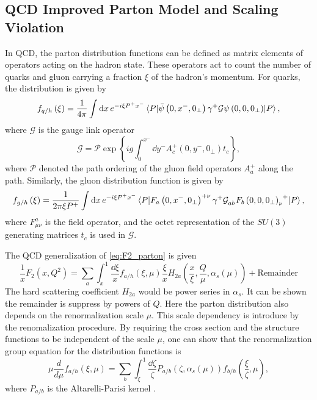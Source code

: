 \documentclass[../main.tex]{subfiles}
\begin{document}
\subsection{QCD Improved Parton Model and Scaling Violation}
\label{subsec:scaling_violation}
In QCD, the parton distribution functions can be defined as matrix elements of
operators acting on the hadron state. These operators act to count the number of
quarks and gluon carrying a fraction $\xi$ of the hadron's momentum. For quarks,
the distribution is given by \cite{collins1989}
\begin{equation}
	f_{q/h}\left(\xi\right) = \frac{1}{4\pi}\int \dd{x} e^{-i\xi P^{+} x^{-}} \mel{P}{\bar{\psi}\left(0,x^-,0_\perp\right)\gamma^+ \mathcal{G} \psi\left(0,0,0_\perp\right)}{P},
\end{equation}
where $\mathcal{G}$ is the gauge link operator
\begin{equation}
	\mathcal{G}=\mathcal{P} \exp \left\{ ig\int_0^{x^-}\dd{y^-} A_c^+ \left(0,y^-,0_\perp\right)t_c\right\},
\end{equation}
where $\mathcal{P}$ denoted the path ordering of the gluon field operators $A_a^+$
along the path. Similarly, the gluon distribution function is given by
\begin{equation}
	f_{g/h}\left(\xi\right) = \frac{1}{2\pi\xi P^+}\int \dd{x} e^{-i\xi P^{+} x^{-}} \mel{P}{\tensor{F_a\left(0,x^-,0_\perp\right)}{^+^\nu}\gamma^{+} \tensor{\mathcal{G}}{_a_b} \tensor{F_b\left(0,0,0_\perp\right)}{_\nu^+}}{P},
\end{equation}
where $F^a_{\mu\nu}$ is the field operator, and the octet representation of the $SU(3)$
generating matrices $t_c$ is used in $\mathcal{G}$.


The QCD generalization of \cref{eq:F2_parton} is given
\begin{equation}
	\frac{1}{x}F_2\left(x,Q^2\right) = \sum_a \int_x^1 \frac{\dd{\xi}}{x}f_{a/h}\left(\xi,\mu\right)\frac{\xi}{x}H_{2a}\left( \frac{x}{\xi}, \frac{Q}{\mu}, \alpha_s\left(\mu\right)\right)
	+ \text{Remainder}
\end{equation}
The hard scattering coefficient $H_{2a}$ would be power series in $\alpha_s$. It
can be shown the remainder is suppress by powers of $Q$. Here the parton
distribution also depends on the renormalization scale $\mu$. This scale
dependency is introduce by the renomalization procedure. By requiring the cross
section and the structure functions to be independent of the scale $\mu$,
one can show that the renormalization group equation for the distribution
functions is
\begin{equation}
	\mu\frac{d}{d\mu}f_{a/h}\left(\xi,\mu\right)=\sum_b \int_\xi^1 \frac{\dd{\zeta}}{\zeta} P_{a/b}\left(\zeta,\alpha_s\left(\mu\right)\right) f_{b/h}\left(\frac{\xi}{\zeta},\mu\right),
\end{equation}
where $P_{a/b}$ is the Altarelli-Parisi kernel \cite{altarelli1977}.
\end{document}
